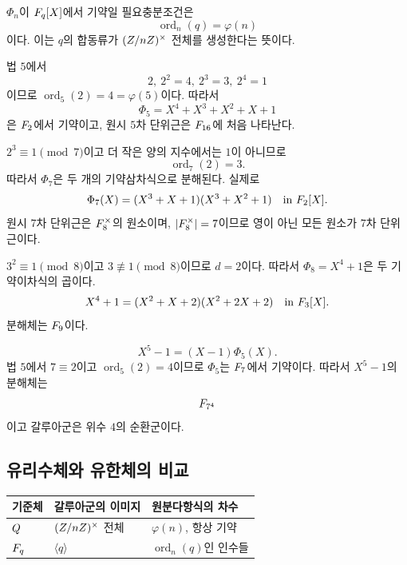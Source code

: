 \begin{corollary}[기약성 판정]
\label{cor:finite-field-cyclotomic-irreducible}
$\Phi_n$이 $F_q[X]$에서 기약일 필요충분조건은
\[
  \operatorname{ord}_n(q)=\varphi(n)
\]
이다. 이는 $q$의 합동류가 $(Z/nZ)^\times$ 전체를 생성한다는 뜻이다.
\end{corollary}

\begin{example}
법 $5$에서
\[
  2,\ 2^2=4,\ 2^3=3,\ 2^4=1
\]
이므로 $\operatorname{ord}_5(2)=4=\varphi(5)$이다. 따라서
\[
  \Phi_5=X^4+X^3+X^2+X+1
\]
은 $F_2$에서 기약이고, 원시 $5$차 단위근은 $F_{16}$에 처음 나타난다.
\end{example}

\begin{example}
$2^3\equiv1\pmod7$이고 더 작은 양의 지수에서는 $1$이 아니므로
\[
  \operatorname{ord}_7(2)=3.
\]
따라서 $\Phi_7$은 두 개의 기약삼차식으로 분해된다. 실제로
\[
  \Phi_7(X)
  =(X^3+X+1)(X^3+X^2+1)
  \quad\text{in }F_2[X].
\]
원시 $7$차 단위근은 $F_8^\times$의 원소이며, $|F_8^\times|=7$이므로 영이 아닌 모든 원소가 $7$차 단위근이다.
\end{example}

\begin{example}
$3^2\equiv1\pmod8$이고 $3\not\equiv1\pmod8$이므로 $d=2$이다. 따라서 $\Phi_8=X^4+1$은 두 기약이차식의 곱이다.
\[
  X^4+1
  =(X^2+X+2)(X^2+2X+2)
  \quad\text{in }F_3[X].
\]
분해체는 $F_9$이다.
\end{example}

\begin{example}[$X^5-1$ over $\F_7$]
\[
  X^5-1=(X-1)\Phi_5(X).
\]
법 $5$에서 $7\equiv2$이고 $\operatorname{ord}_5(2)=4$이므로 $\Phi_5$는 $\F_7$에서 기약이다. 따라서 $X^5-1$의 분해체는
\[
  F_{7^4}
\]
이고 갈루아군은 위수 $4$의 순환군이다.
\end{example}

\subsection{유리수체와 유한체의 비교}

\begin{center}
\renewcommand{\arraystretch}{1.25}
\begin{tabular}{lll}
\toprule
기준체 & 갈루아군의 이미지 & 원분다항식의 차수 \\
\midrule
$Q$ & $(Z/nZ)^\times$ 전체 & $\varphi(n)$, 항상 기약 \\
$F_q$ & $\langle q\rangle$ & $\operatorname{ord}_n(q)$인 인수들 \\
\bottomrule
\end{tabular}
\end{center}

